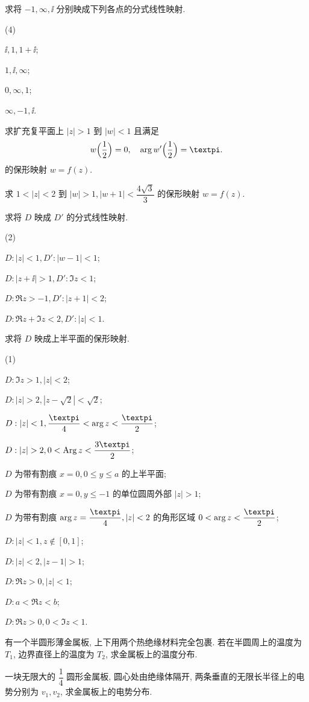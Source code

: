\begin{homework}
\begin{homework}
    \item 求将 $-1,\infty,\ii$ 分别映成下列各点的分式线性映射.
    \begin{subhomework}(4)
      \item $\ii,1,1+\ii$;
      \item $1,\ii,\infty$;
      \item $0,\infty,1$;
      \item $\infty,-1,\ii$.
    \end{subhomework}
    \item 求扩充复平面上 $|z|>1$ 到 $|w|<1$ 且满足
    \[
      w\Bigl(\frac12\Bigr)=0,\quad
      \arg w'\Bigl(\frac12\Bigr)=\cpi.
    \]
    的保形映射 $w=f(z)$.
    \item 求 $1<|z|<2$ 到 $|w|>1, |w+1|<\dfrac{4\sqrt3}3$ 的保形映射 $w=f(z)$.
    \item 求将 $D$ 映成 $D'$ 的分式线性映射.
    \begin{subhomework}(2)
      \item $D: |z|<1, D': |w-1|<1$;
      \item $D: |z+\ii|>1, D': \Im z<1$;
      \item $D: \Re z>-1, D': |z+1|<2$;
      \item $D: \Re z+\Im z<2, D': |z|<1$.
    \end{subhomework}
    \item 求将 $D$ 映成上半平面的保形映射.
    \begin{subhomework}(1)
      \item $D: \Im z>1, |z|<2$;
      \item $D: |z|>2, |z-\sqrt2|<\sqrt 2$;
      \item $D: |z|<1, \dfrac\cpi4<\arg z<\dfrac \cpi2$;
      \item $D:|z|>2, 0<\Arg z<\dfrac{3\cpi}2$;
      \item $D$ 为带有割痕 $x=0,0\le y\le a$ 的上半平面;
      \item $D$ 为带有割痕 $x=0,y\le -1$ 的单位圆周外部 $|z|>1$;
      \item $D$ 为带有割痕 $\arg z=\dfrac\cpi4, |z|<2$ 的角形区域 $0<\arg z<\dfrac\cpi2$;
      \item $D: |z|<1, z\notin[0,1]$;
      \item $D: |z|<2, |z-1|>1$;
      \item $D: \Re z>0, |z|<1$;
      \item $D: a<\Re z<b$;
      \item $D: \Re z>0, 0<\Im z<1$.
    \end{subhomework}
    \item 有一个半圆形薄金属板, 上下用两个热绝缘材料完全包裹. 若在半圆周上的温度为 $T_1$, 边界直径上的温度为 $T_2$, 求金属板上的温度分布.
    \item 一块无限大的 $\dfrac14$ 圆形金属板, 圆心处由绝缘体隔开, 两条垂直的无限长半径上的电势分别为 $v_1,v_2$, 求金属板上的电势分布.
  \end{homework}
\end{homework}
  


